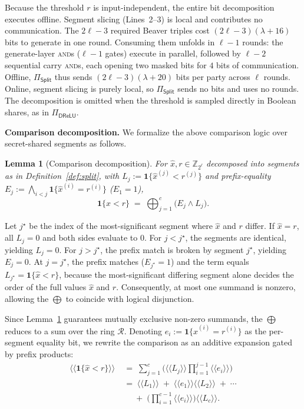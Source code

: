 \documentclass[journal]{IEEEtran}
\newtheorem{lemma}{Lemma}
\theoremstyle{definition}
\theoremstyle{plain}
\newcommand{\Z}{\mathbb{Z}}
\newcommand{\R}{\mathcal{R}}                              %
\newcommand{\rshare}[1]{\langle\!\langle #1 \rangle\!\rangle} %
\newcommand{\DReLU}{\mathsf{DReLU}}
\newcommand{\ind}[1]{\mathbf{1}\{#1\}}
\newcommand{\xhat}{\hat{x}}
\newcommand{\seg}[1]{^{\scriptscriptstyle(#1)}}   %
\newcommand{\nseg}{c}                              %
\begin{document}
Because the threshold $r$ is input-independent, the entire bit decomposition
executes offline. Segment slicing (Lines~2--3) is local and contributes no
communication. The $2\ell{-}3$ required Beaver triples cost
$(2\ell{-}3)(\lambda{+}16)$ bits to generate in one round. Consuming them
unfolds in $\ell{-}1$ rounds: the generate-layer \textsc{and}s ($\ell{-}1$ gates)
execute in parallel, followed by $\ell{-}2$ sequential carry \textsc{and}s, each
opening two masked bits for $4$ bits of communication. Offline,
$\Pi_{\mathsf{Split}}$ thus sends $(2\ell{-}3)(\lambda{+}20)$ bits per party across
$\ell$ rounds. Online, segment slicing is purely local, so $\Pi_{\mathsf{Split}}$
sends no bits and uses no rounds. The decomposition is omitted when the threshold
is sampled directly in Boolean shares, as in $\Pi_{\DReLU}$.

\textbf{Comparison decomposition.}
We formalize the above comparison logic over secret-shared segments as follows.

\begin{lemma}[Comparison decomposition]\label{lem:decomp}
For $\xhat,r\in\Z_{2^{\ell}}$ decomposed into segments as in Definition~\ref{def:split}, with
$L_j:=\ind{\xhat\seg{j}<r\seg{j}}$ and prefix-equality
$E_j:=\bigwedge_{i<j}\ind{\xhat\seg{i}=r\seg{i}}$ ($E_1=1$),
\begin{equation}
\ind{\xhat<r}\;=\;\bigoplus_{j=1}^{\nseg}\big(E_j\wedge L_j\big).
\label{eq:decomp}
\end{equation}
\end{lemma}
\begin{IEEEproof}
Let $j^\star$ be the index of the most-significant segment where $\xhat$ and $r$ differ. 
If $\xhat=r$, all $L_j=0$ and both sides evaluate to $0$. For $j<j^\star$, the segments are identical, 
yielding $L_j=0$. For $j>j^\star$, the prefix match is broken by segment $j^\star$, yielding $E_j=0$. At $j=j^\star$, 
the prefix matches ($E_{j^\star}=1$) and the term equals $L_{j^\star}=\ind{\xhat<r}$,
because the most-significant differing segment alone decides the order of the full values $\xhat$ and $r$.
Consequently, at most one summand is nonzero, allowing the $\bigoplus$ to coincide with logical disjunction.
\end{IEEEproof}

Since Lemma~\ref{lem:decomp} guarantees mutually exclusive non-zero summands,
the $\bigoplus$ reduces to a sum over the ring $\R$.
Denoting $e_i:=\ind{\xhat\seg{i}=r\seg{i}}$ as the per-segment equality bit,
we rewrite the comparison as an additive expansion gated by prefix products:
\begin{equation}\label{eq:decomp-ss}
\begin{aligned}
\rshare{\ind{\xhat<r}}
\;&=\;\sum_{j=1}^{\nseg}\Big(\rshare{L_j}\!\!\prod_{i=1}^{j-1}\rshare{e_i}\Big) \\
\;&=\;\rshare{L_1}\;+\;\rshare{e_1}\rshare{L_2}\;+\;\cdots \\
&\quad\;+\;\Big(\textstyle\prod_{i=1}^{\nseg-1}\rshare{e_i}\Big)\rshare{L_{\nseg}}.
\end{aligned}
\end{equation}
\end{document}
